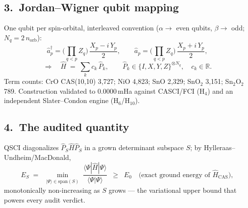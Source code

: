 \documentclass[11pt]{article}
\begin{document}
\subsection*{3.\ Jordan--Wigner qubit mapping}
One qubit per spin-orbital, interleaved convention
($\alpha \to$ even qubits, $\beta \to$ odd; $N_q = 2\,n_{\mathrm{orb}}$):
\begin{equation}
\hat a_p^{\dagger} = \Big( \prod_{q<p} Z_q \Big)\,
   \frac{X_p - i\,Y_p}{2}, \qquad
\hat a_p = \Big( \prod_{q<p} Z_q \Big)\, \frac{X_p + i\,Y_p}{2},
\end{equation}
\begin{equation}
\Longrightarrow\quad
\hat H \;=\; \sum_{k} c_k\, \hat P_k, \qquad
\hat P_k \in \{I, X, Y, Z\}^{\otimes N_q}, \quad c_k \in \mathbb{R}.
\end{equation}
Term counts: CrO CAS(10,10) 3{,}727; NiO 4{,}823; SnO 2{,}329;
SnO$_2$ 3{,}151; Sn$_2$O$_2$ 789. Construction validated to 0.0000\,mHa
against CASCI/FCI (H$_4$) and an independent Slater--Condon engine
(H$_6$/H$_{10}$).

\subsection*{4.\ The audited quantity}
QSCI diagonalizes $\hat P_S \hat H \hat P_S$ in a grown determinant subspace
$S$; by Hylleraas--Undheim/MacDonald,
\begin{equation}
E_S \;=\; \min_{\substack{|\Psi\rangle \in \mathrm{span}(S)}}
  \frac{\langle \Psi|\hat H|\Psi\rangle}{\langle \Psi|\Psi\rangle}
  \;\;\geq\;\; E_0 \quad\text{(exact ground energy of } \hat H_{\mathrm{CAS}}),
\end{equation}
monotonically non-increasing as $S$ grows --- the variational upper bound that
powers every audit verdict.
\end{document}
